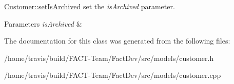 \hyperlink{classModels_1_1Customer_a15ec2603da3dd66c9355a9604b5abded}{Customer\-::set\-Is\-Archived} set the {\itshape is\-Archived} parameter. 


\begin{DoxyParams}{Parameters}
{\em is\-Archived} & \\
\hline
\end{DoxyParams}


The documentation for this class was generated from the following files\-:\begin{DoxyCompactItemize}
\item 
/home/travis/build/\-F\-A\-C\-T-\/\-Team/\-Fact\-Dev/src/models/customer.\-h\item 
/home/travis/build/\-F\-A\-C\-T-\/\-Team/\-Fact\-Dev/src/models/customer.\-cpp\end{DoxyCompactItemize}
